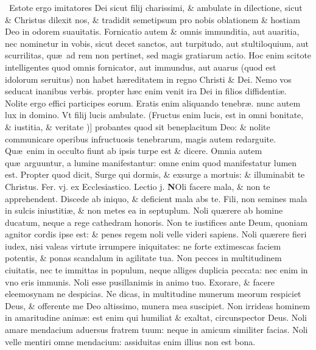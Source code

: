 \documentclass[a5paper,10pt]{book}
\def\rightmarginnote{%
	\lrmarginnote{\hskip\columnwidth \hskip -1em}}
\def\ae{æ}
\begin{document}
\begin{multicols*}{2}
\newline \textdagger \ Estote\rightmarginnote{c.5.a} ergo imitatores Dei sicut filij charissimi, \& ambulate in dilectione, sicut \& Christus dilexit nos, \& tradidit semetipsum pro nobis oblationem \& hostiam Deo in odorem suauitatis.
Fornicatio autem \& omnis immunditia, aut auaritia, nec nominetur in vobis, sicut decet sanctos, aut turpitudo, aut stultiloquium, aut scurrilitas, qu\ae \ ad rem non pertinet, sed magis gratiarum actio.
Hoc enim scitote intelligentes quod omnis fornicator, aut immundus, aut auarus (quod est idolorum seruitus) non habet h\ae reditatem in regno Christi \& Dei.
Nemo vos seducat inanibus verbis. propter h\ae c enim venit ira Dei in filios diffidenti\ae . Nolite ergo effici participes eorum.
Eratis enim aliquando tenebr\ae . nunc autem lux in domino. Vt filij lucis ambulate. (Fructus enim lucis, est in omni bonitate, \& iustitia, \& veritate\rightmarginnote{B})] probantes quod sit beneplacitum Deo: \& nolite communicare operibus infructuosis tenebrarum, magis autem redarguite.
Qu\ae \ enim in occulto fiunt ab ipsis turpe est \& dicere. Omnia autem qu\ae \ arguuntur, a lumine manifestantur: omne enim quod manifestatur lumen est.
Propter quod dicit, Surge
qui dormis, \& exsurge a mortuis: \& illuminabit te Christus.
\newline {} \color{red} \hypertarget{FRI-SECVNDA-VAGAN}{Fer. vj.} ex Ecclesiastico. Lectio j. \color{black}
\vspace{-1.25em}
\lettrine[lines=2]{\bfseries N}{}Oli\rightmarginnote{ca. 7.} facere mala, \& non te apprehendent. Discede ab iniquo, \& deficient mala abs te.
Fili, non semines mala in sulcis iniustiti\ae , \& non metes ea in septuplum. Noli qu\ae rere ab homine ducatum, neque a rege cathedram honoris.
Non te iustifices ante Deum, quoniam agnitor cordis ipse est: \& penes regem noli velle videri sapiens.
Noli qu\ae rere fieri iudex, nisi valeas virtute irrumpere iniquitates: ne forte extimescas faciem potentis, \& ponas scandalum in agilitate tua.
Non pecces in multitudinem ciuitatis, nec te immittas in populum, neque alliges duplicia peccata: nec enim in vno eris immunis.
Noli esse pusillanimis in animo tuo. Exorare, \& facere eleemosynam ne despicias.
Ne dicas, in multitudine munerum meorum respiciet Deus, \& offerente me Deo altissimo, munera mea suscipiet.
Non irrideas hominem in amaritudine anim\ae : est enim qui humiliat \& exaltat, circunspector Deus.
Noli amare mendacium aduersus fratrem tuum: neque in amicum similiter facias. Noli velle mentiri omne mendacium: assiduitas enim illius non est bona.

\end{multicols*}
\end{document}
